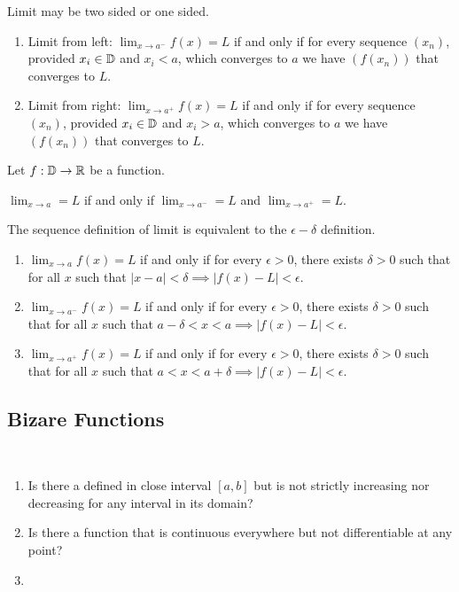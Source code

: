 \documentclass[../note.tex]{subfiles}
\begin{document}
\begin{definition}
	Limit may be two sided or one sided.
	\begin{enumerate}
	\item Limit from left: $\lim_{x \rightarrow a^-} f(x)=L$ if and only if for every sequence $(x_n)$, provided $x_i \in \mathbb{D}$ and $x_i<a$, which converges to $a$ we have $(f(x_n))$ that converges to $L$.
	\item Limit from right: $\lim_{x \rightarrow a^+} f(x)=L$ if and only if for every sequence $(x_n)$, provided $x_i \in \mathbb{D}$ and $x_i>a$, which converges to $a$ we have $(f(x_n))$ that converges to $L$.
	\end{enumerate}
\end{definition}

\begin{definition} 
\end{definition}

\begin{theorem}
	Let $f: \mathbb{D} \rightarrow \mathbb{R}$ be a function. 

	$\lim_{x \rightarrow a}=L$ if and only if $\lim_{x \rightarrow a^-}=L$ and $\lim_{x \rightarrow a^+}=L$.
\end{theorem}

\begin{theorem}
	The sequence definition of limit is equivalent to the $\epsilon-\delta$ definition.
	\begin{enumerate}
	\item $\lim_{x \rightarrow a} f(x)=L$ if and only if for every $\epsilon > 0$, there exists $\delta > 0$ such that for all $x$ such that $|x-a|<\delta \implies |f(x)-L|<\epsilon$.
	\item $\lim_{x \rightarrow a^-} f(x)=L$ if and only if for every $\epsilon > 0$, there exists $\delta > 0$ such that for all $x$ such that $a-\delta<x<a \implies |f(x)-L|<\epsilon$.
	\item $\lim_{x \rightarrow a^+} f(x)=L$ if and only if for every $\epsilon > 0$, there exists $\delta > 0$ such that for all $x$ such that $a<x<a+\delta \implies |f(x)-L|<\epsilon$.
	\end{enumerate}
\end{theorem}

\subsection{Bizare Functions}
\begin{hypothesis}
	\ 
\begin{enumerate}
	\item Is there a defined in close interval $[a,b]$ but is not strictly increasing nor decreasing for any interval in its domain? 
	\item Is there a function that is continuous everywhere but not differentiable at any point?
	\item  
\end{enumerate}
\end{hypothesis}
\end{document}
